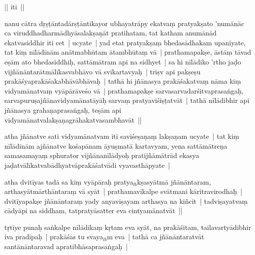 \documentclass[article,12pt,a4paper]{memoir}%
\newcounter{parCount}
\begin{document}
	  
	  

	  \pstart \leavevmode%
	|| iti ||
	{}
	\pend%
      

	  \pstart \leavevmode%
	\label{thakur75-141.30}nanu cātra dṛṣṭāntadārṣṭāntikayor ubhayatrāpy ekatvaṃ pratyakṣato 'numānāc ca viruddhadharmādhyāsalakṣaṇāt pratihatam, tat katham anumānād ekatvasiddhir iti cet | ucyate | yad etat pratyakṣaṃ bhedasādhakam upanīyate, tat kiṃ nīlādīnām anātmabhūtam ātambhūtaṃ vā | prathamapakṣe, āstāṃ tāvad eṣām ato bhedasiddhiḥ, \leavevmode{}\label{RNAms_76a} sattāmātram api na sidhyet | sa hi nīlādiko 'rtho jaḍo vijñānāntarātmālīkasvabhāvo vā svīkartavyaḥ | triṣv api pakṣeṣu prakāśyaprakāśakabhāvābhāvaḥ | tathā hi jñānasya prakāśakatvaṃ nāma kiṃ vidyamānatvaṃ vyāpārāveśo vā | prathamapakṣe sarvasarvadarśitvaprasaṅgaḥ, sarvapuruṣajñānavidyamānatāyāḥ sarvaṃ pratyaviśiṣṭatvāt | tathā nīlādibhir api jñānasya grahaṇaprasaṅgaḥ, teṣām api vidyamānatvalakṣaṇagrāhakatvasambhavāt ||
	{}
	\pend%
      

	  \pstart \leavevmode%
	\label{thakur75-142.7}atha jñānatve sati vidyamānatvam iti saviśeṣaṇaṃ lakṣaṇam ucyate | tat kiṃ nīlādīnām ajñānatve kośapānam āyuṣmatā kartavyam, yena sattāmātreṇa samasamayaṃ sphurator vijñānanīlādyoḥ pratijñāmātrād ekasya jaḍatvālīkatvabādhyatvāprakāśatvādi vyavasthāpyate |
	{}
	\pend%
      

	  \pstart \leavevmode%
	\label{thakur75-142.11}atha dvitīyas tadā sa kiṃ vyāpāraḥ pratya{\tiny $_{lb}$}\label{RNAms_76a3}kṣasyātmā jñānāntaram, arthasyātmārthāntaraṃ vā syāt | prathamavikalpe svātmani kāritravirodhaḥ | dvitīyapakṣe jñānāntaraṃ yady anyaviṣayam arthasya na kiñcit | tadviṣayatvaṃ cādyāpi na siddham, tatpratyāsatter eva cintyamānatvāt ||
	{}
	\pend%
      

	  \pstart \leavevmode%
	\label{thakur75-142.15}tṛtīye punaḥ saṅkalpe nīlādikaṃ kṛtam eva syāt, na prakāśitam, tailavartyādibhir iva pradīpaḥ | prakāśas tu svaya{\tiny $_{lb}$}\label{RNAms_76a4}m eva | tathā ca jñānāntaratvāt santānāntaravad apratibhāsaprasaṅgaḥ |
	{}
	\pend%
      
\end{document}
